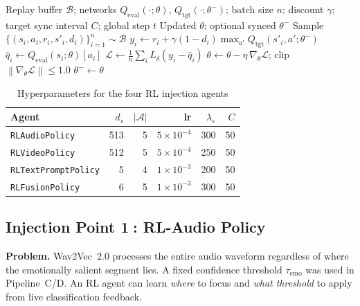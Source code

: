\documentclass[12pt,a4paper]{article}
\theoremstyle{definition}
\theoremstyle{plain}
\theoremstyle{remark}
\newcommand{\Norm}[1]{\left\|#1\right\|}
\newcommand{\Loss}{\mathcal{L}}
\begin{document}
\begin{algorithm}[H]
\caption{Generic DQN Train Step (shared by all four agents)}
\label{alg:dqn_step}
\begin{algorithmic}[1]
\Require Replay buffer $\mathcal{B}$; networks $Q_{\text{eval}}(\cdot;\theta)$,
         $Q_{\text{tgt}}(\cdot;\theta^-)$; batch size $n$; discount $\gamma$;
         target sync interval $C$; global step $t$
\Ensure Updated $\theta$; optional synced $\theta^-$
 \Return \EndIf
\State Sample $\{(s_i,a_i,r_i,s'_i,d_i)\}_{i=1}^n \sim \mathcal{B}$
\State $y_i \gets r_i + \gamma(1-d_i)\max_{a'}Q_{\text{tgt}}(s'_i,a';\theta^-)$
\State $\hat{q}_i \gets Q_{\text{eval}}(s_i;\theta)[a_i]$
\State $\Loss \gets \frac{1}{n}\sum_i L_\delta(y_i - \hat{q}_i)$
\State $\theta \gets \theta - \eta\,\nabla_\theta\Loss$;
       \quad clip $\Norm{\nabla_\theta\Loss}\le 1.0$
 $\theta^- \gets \theta$ \EndIf
{}
\end{algorithmic}
\end{algorithm}

\begin{table}[H]
\centering
\caption{Hyperparameters for the four RL injection agents}
\label{tab:rl_hyperparams}
\begin{tabular}{lrrrrr}
\toprule
\textbf{Agent} & $d_s$ & $|\mathcal{A}|$ & lr & $\lambda_\varepsilon$ & $C$ \\
\midrule
\texttt{RLAudioPolicy}       & 513 & 5 & $5\times10^{-4}$ & 300 & 50 \\
\texttt{RLVideoPolicy}       & 512 & 5 & $5\times10^{-4}$ & 250 & 50 \\
\texttt{RLTextPromptPolicy}  &   5 & 4 & $1\times10^{-3}$ & 200 & 50 \\
\texttt{RLFusionPolicy}      &   6 & 5 & $1\times10^{-3}$ & 300 & 50 \\
\bottomrule
\end{tabular}
\end{table}

\subsection{Injection Point \textcircled{1}: RL-Audio Policy}
\label{sec:rl_audio}

\begin{tcolorbox}[rlinjbox,title={Injection \textcircled{1} --- RL-Audio}]
\textbf{Problem.}
Wav2Vec~2.0 processes the entire audio waveform regardless of where the
emotionally salient segment lies.  A fixed confidence threshold $\tau_{\text{emo}}$
was used in Pipeline~C/D.  An RL agent can learn \emph{where} to focus and
\emph{what threshold} to apply from live classification feedback.
\end{tcolorbox}
\end{document}
